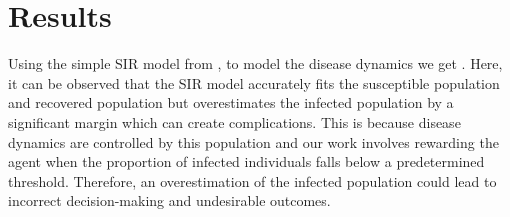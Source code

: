 \documentclass[tikz,fleqn,12pt]{wlscirep}
\begin{document}
\section{Results}
Using the simple SIR model from ,  to model the disease dynamics we get . Here, it can be observed that the SIR model accurately fits the susceptible population and recovered population but overestimates the infected population by a significant margin which can create complications. This is because disease dynamics are controlled by this population and our work involves rewarding the agent when the proportion of infected individuals falls below a predetermined threshold. Therefore, an overestimation of the infected population could lead to incorrect decision-making and undesirable outcomes.
\end{document}

